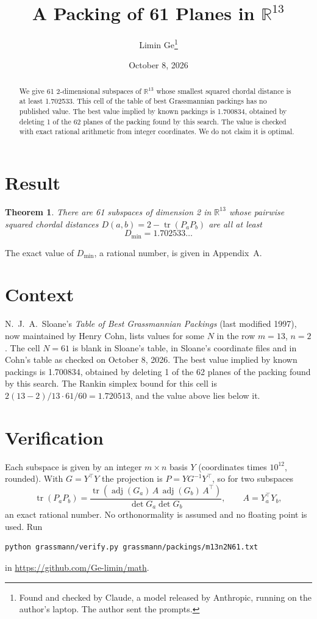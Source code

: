 \documentclass[11pt,a4paper]{article}
\title{A Packing of 61 Planes in $\mathbb{R}^{13}$}
\author{Limin Ge\thanks{Found and checked by Claude, a model released by Anthropic, running on the author's laptop. The author sent the prompts.}}
\date{October 8, 2026}
\newtheorem*{theorem}{Theorem}
\begin{document}
\maketitle
\begin{abstract}
We give 61 2-dimensional subspaces of $\mathbb{R}^{13}$ whose smallest squared chordal distance is at least 1.702533. This cell of the table of best Grassmannian packings has no published value. The best value implied by known packings is 1.700834, obtained by deleting 1 of the 62 planes of the packing found by this search. The value is checked with exact rational arithmetic from integer coordinates. We do not claim it is optimal.
\end{abstract}

\section{Result}
\begin{theorem}
There are 61 subspaces of dimension 2 in $\mathbb{R}^{13}$ whose pairwise squared chordal distances $D(a,b) = 2 - \operatorname{tr}(P_aP_b)$ are all at least
\[ D_{\min} = 1.702533\ldots \]
\end{theorem}
The exact value of $D_{\min}$, a rational number, is given in Appendix~A.


\section{Context}
N.~J.~A.~Sloane's \emph{Table of Best Grassmannian Packings} (last modified 1997), now maintained by Henry Cohn, lists values for some $N$ in the row $m=13$, $n=2$. The cell $N=61$ is blank in Sloane's table, in Sloane's coordinate files and in Cohn's table as checked on October 8, 2026. The best value implied by known packings is 1.700834, obtained by deleting 1 of the 62 planes of the packing found by this search. The Rankin simplex bound for this cell is $2(13-2)/13\cdot 61/60 = 1.720513$, and the value above lies below it.


\section{Verification}
Each subspace is given by an integer $m\times n$ basis $Y$ (coordinates times $10^{12}$, rounded). With $G=Y^\top Y$ the projection is $P=YG^{-1}Y^\top$, so for two subspaces
\[ \operatorname{tr}(P_aP_b)=\frac{\operatorname{tr}(\operatorname{adj}(G_a)\,A\,\operatorname{adj}(G_b)\,A^\top)}{\det G_a\det G_b},\qquad A=Y_a^\top Y_b, \]
an exact rational number. No orthonormality is assumed and no floating point is used. Run
\begin{verbatim}
python grassmann/verify.py grassmann/packings/m13n2N61.txt
\end{verbatim}
in \url{https://github.com/Ge-limin/math}.
\end{document}
